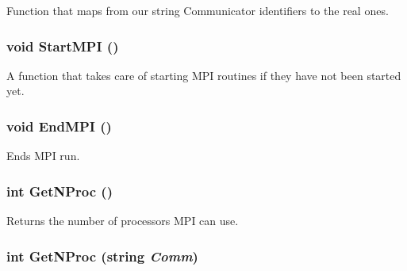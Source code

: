 Function that maps from our string Communicator identifiers to the real ones. \hypertarget{classJKBuilder_1_1MPIManager_a5097097fb8c69072f75bfc3a496abe1e}{
\subsubsection[{StartMPI}]{\setlength{\rightskip}{0pt plus 5cm}void StartMPI ()}}
\label{classJKBuilder_1_1MPIManager_a5097097fb8c69072f75bfc3a496abe1e}


A function that takes care of starting MPI routines if they have not been started yet. \hypertarget{classJKBuilder_1_1MPIManager_a2eaaa3e6682681e7f143eabf2f3b2a22}{
\subsubsection[{EndMPI}]{\setlength{\rightskip}{0pt plus 5cm}void EndMPI ()}}
\label{classJKBuilder_1_1MPIManager_a2eaaa3e6682681e7f143eabf2f3b2a22}


Ends MPI run. \hypertarget{classJKBuilder_1_1MPIManager_af29235075c80eddd344e686522304ae3}{
\subsubsection[{GetNProc}]{\setlength{\rightskip}{0pt plus 5cm}int GetNProc ()}}
\label{classJKBuilder_1_1MPIManager_af29235075c80eddd344e686522304ae3}


Returns the number of processors MPI can use. \hypertarget{classJKBuilder_1_1MPIManager_ad7e8bcb21ab0390b8330848222de5dcd}{
\subsubsection[{GetNProc}]{\setlength{\rightskip}{0pt plus 5cm}int GetNProc (string {\em Comm})}}
\label{classJKBuilder_1_1MPIManager_ad7e8bcb21ab0390b8330848222de5dcd}


